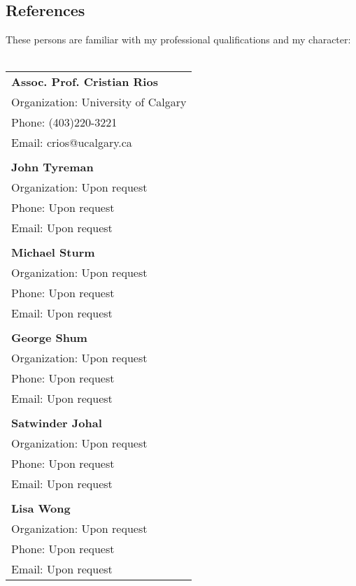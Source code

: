 \documentclass[12pt]{article}
\begin{document}
\subsection*{References}
These persons are familiar with my professional qualifications and my character:\\
\\
\begin{tabular}{l}
	\textbf{Assoc. Prof. Cristian Rios}\\
	Organization: University of Calgary\\
	Phone: (403)220-3221\\
	Email: crios@ucalgary.ca\\
	\\
	\textbf{John Tyreman}\\
	Organization: Upon request\\
	Phone: Upon request\\
	Email: Upon request\\
	\\
	\textbf{Michael Sturm}\\
	Organization: Upon request\\
	Phone: Upon request\\
	Email: Upon request\\
	\\
	\textbf{George Shum}\\
	Organization: Upon request\\
	Phone: Upon request\\
	Email: Upon request\\
	\\
	\textbf{Satwinder Johal}\\
	Organization: Upon request\\
	Phone: Upon request\\
	Email: Upon request\\
	\\
	\textbf{Lisa Wong}\\
	Organization: Upon request\\
	Phone: Upon request\\
	Email: Upon request\\
\end{tabular}
\end{document}
